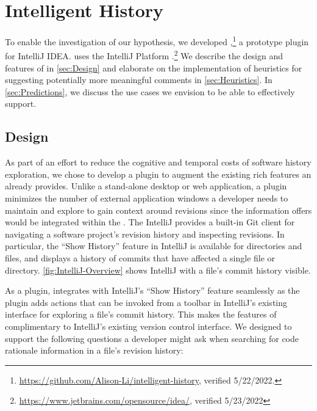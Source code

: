 \chapter{Intelligent History}
\label{ch:Intelligent-History}

To enable the investigation of our hypothesis, we developed ,\footnote{\url{https://github.com/Alison-Li/intelligent-history}, verified 5/22/2022.} a prototype plugin for IntelliJ IDEA.
 uses the IntelliJ Platform .\footnote{\url{https://www.jetbrains.com/opensource/idea/}, verified 5/23/2022}
We describe the design and features of \toolname in \autoref{sec:Design} and elaborate on the implementation of heuristics
for suggesting potentially more meaningful comments in \autoref{sec:Heuristics}.
In \autoref{sec:Predictions}, we discuss the use cases we envision  to be able to effectively support.

\section{Design}
\label{sec:Design}

As part of an effort to reduce the cognitive and temporal costs of software history exploration, we chose to develop a plugin to augment the existing rich features an  already provides.
Unlike a stand-alone desktop or web application, a plugin minimizes the number of external application windows a developer needs to maintain and explore to gain context around revisions since the information  offers would be integrated within the .
The IntelliJ  provides a built-in Git client  for navigating a software project's revision history and inspecting revisions. 
In particular, the ``Show History'' feature in IntelliJ is available for directories and files, and displays a history of commits that have affected a single file or directory.
\autoref{fig:IntelliJ-Overview} shows IntelliJ with a file's commit history visible.

As a plugin,  integrates with IntelliJ's ``Show History'' feature seamlessly as the plugin adds actions that can be invoked from a toolbar in IntelliJ's existing interface for exploring a file's commit history. 
This makes the features of  complimentary to IntelliJ's existing version control interface.
We designed  to support the following questions a developer might ask when searching for code rationale information in a file's revision history:

